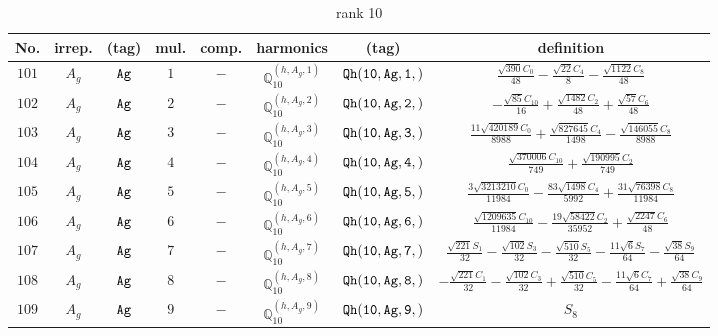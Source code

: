 \documentclass[fleqn,8pt]{jsarticle}
\begin{document}
\begin{table}[ht!]
\begin{center}
\caption{rank 10}
\renewcommand{\arraystretch}{1.3}
\begin{tabular}{cccccccc} \hline \hline
No. & irrep. & (tag) & mul. & comp. & harmonics & (tag) & definition \\ \hline
$ 101 $ & $ A_{g} $ & $ {\tt Ag} $ & $ 1 $ & $ - $ & $ \mathbb{Q}_{10}^{(h,A_{g},1)} $ & $ {\tt Qh(10,Ag,1,)} $ & $ \frac{\sqrt{390} C_{0}}{48} - \frac{\sqrt{22} C_{4}}{8} - \frac{\sqrt{1122} C_{8}}{48} $ \\
$ 102 $ & $ A_{g} $ & $ {\tt Ag} $ & $ 2 $ & $ - $ & $ \mathbb{Q}_{10}^{(h,A_{g},2)} $ & $ {\tt Qh(10,Ag,2,)} $ & $ - \frac{\sqrt{85} C_{10}}{16} + \frac{\sqrt{1482} C_{2}}{48} + \frac{\sqrt{57} C_{6}}{48} $ \\
$ 103 $ & $ A_{g} $ & $ {\tt Ag} $ & $ 3 $ & $ - $ & $ \mathbb{Q}_{10}^{(h,A_{g},3)} $ & $ {\tt Qh(10,Ag,3,)} $ & $ \frac{11 \sqrt{420189} C_{0}}{8988} + \frac{\sqrt{827645} C_{4}}{1498} - \frac{\sqrt{146055} C_{8}}{8988} $ \\
$ 104 $ & $ A_{g} $ & $ {\tt Ag} $ & $ 4 $ & $ - $ & $ \mathbb{Q}_{10}^{(h,A_{g},4)} $ & $ {\tt Qh(10,Ag,4,)} $ & $ \frac{\sqrt{370006} C_{10}}{749} + \frac{\sqrt{190995} C_{2}}{749} $ \\
$ 105 $ & $ A_{g} $ & $ {\tt Ag} $ & $ 5 $ & $ - $ & $ \mathbb{Q}_{10}^{(h,A_{g},5)} $ & $ {\tt Qh(10,Ag,5,)} $ & $ \frac{3 \sqrt{3213210} C_{0}}{11984} - \frac{83 \sqrt{1498} C_{4}}{5992} + \frac{31 \sqrt{76398} C_{8}}{11984} $ \\
$ 106 $ & $ A_{g} $ & $ {\tt Ag} $ & $ 6 $ & $ - $ & $ \mathbb{Q}_{10}^{(h,A_{g},6)} $ & $ {\tt Qh(10,Ag,6,)} $ & $ \frac{\sqrt{1209635} C_{10}}{11984} - \frac{19 \sqrt{58422} C_{2}}{35952} + \frac{\sqrt{2247} C_{6}}{48} $ \\
$ 107 $ & $ A_{g} $ & $ {\tt Ag} $ & $ 7 $ & $ - $ & $ \mathbb{Q}_{10}^{(h,A_{g},7)} $ & $ {\tt Qh(10,Ag,7,)} $ & $ \frac{\sqrt{221} S_{1}}{32} - \frac{\sqrt{102} S_{3}}{32} - \frac{\sqrt{510} S_{5}}{32} - \frac{11 \sqrt{6} S_{7}}{64} - \frac{\sqrt{38} S_{9}}{64} $ \\
$ 108 $ & $ A_{g} $ & $ {\tt Ag} $ & $ 8 $ & $ - $ & $ \mathbb{Q}_{10}^{(h,A_{g},8)} $ & $ {\tt Qh(10,Ag,8,)} $ & $ - \frac{\sqrt{221} C_{1}}{32} - \frac{\sqrt{102} C_{3}}{32} + \frac{\sqrt{510} C_{5}}{32} - \frac{11 \sqrt{6} C_{7}}{64} + \frac{\sqrt{38} C_{9}}{64} $ \\
$ 109 $ & $ A_{g} $ & $ {\tt Ag} $ & $ 9 $ & $ - $ & $ \mathbb{Q}_{10}^{(h,A_{g},9)} $ & $ {\tt Qh(10,Ag,9,)} $ & $ S_{8} $ \\

\end{tabular}
\end{center}
\end{table}
\end{document}
